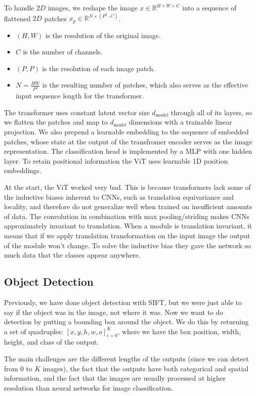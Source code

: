 \documentclass{article}
\begin{document}
To handle $2D$ images, we reshape the image $x \in \mathbb{R}^{H\times W \times C}$ into a sequence of flattened $2D$ patches $x_p \in \mathbb{R}^{N \times (P^2 \cdot C)}$.
\begin{itemize}
  \item $(H, W)$ is the resolution of the original image.
  \item $C$ is the number of channels.
  \item $(P, P)$ is the resolution of each image patch.
  \item $N = \frac{HW}{P^2}$ is the resulting number of patches, which also serves as the effective input sequence length for the transformer.
\end{itemize}

The transformer uses constant latent vector size $d_{\text{model}}$ through all of its layers, so we flatten the patches and map to $d_{\text{model}}$ dimensions with a trainable linear projection.
We also prepend a learnable embedding to the sequence of embedded patches, whose state at the output of the transfromer encoder serves as the image representation.
The classification head is implemented by a MLP with one hidden layer.
To retain positional information the ViT uses learnable 1D position embeddings.

At the start, the ViT worked very bad.
This is because transformers lack some of the inductive biases inherent to CNNs, such as translation equivariance and locality, and therefore do not generalize well when trained on insufficient amounts of data.
The convolution in combination with max pooling/striding makes CNNs approximately invariant to translation.
When a module is translation invariant, it means that if we apply translation transformation on the input image the output of the module won't change.
To solve the inductive bias they gave the network so much data that the classes appear anywhere.

\subsection{Object Detection}
Previously, we have done object detection with SIFT, but we were just able to say if the object was in the image, not where it was.
Now we want to do detection by putting a bounding box around the object.
We do this by returning a set of quadruples: $[x, y, h, w, o]_{i=0}^{K}$, where we have the box position, width, height, and class of the output.

The main challenges are the different lengths of the outputs (since we can detect from 0 to $K$ images), the fact that the outputs have both categorical and spatial information, and the fact that the images are usually processed at higher resolution than neural networks for image classification.
\end{document}
